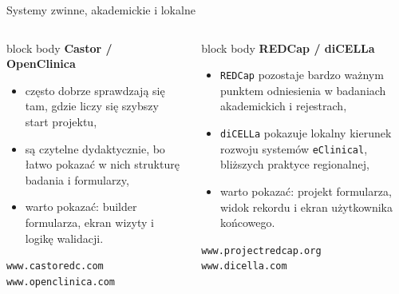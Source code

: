 \begin{frame}{Systemy zwinne, akademickie i lokalne}
  \footnotesize
  \begin{columns}[T,onlytextwidth]
    \begin{beamercolorbox}[wd=\linewidth,sep=0.8em,rounded=true]{block body}
      \textbf{\textcolor{UAFMTeal}{Castor / OpenClinica}}\par\medskip
      \begin{itemize}
        \item często dobrze sprawdzają się tam, gdzie liczy się szybszy start projektu,
        \item są czytelne dydaktycznie, bo łatwo pokazać w nich strukturę badania i formularzy,
        \item warto pokazać: builder formularza, ekran wizyty i logikę walidacji.
      \end{itemize}
      \texttt{www.castoredc.com}\\
      \texttt{www.openclinica.com}
    \end{beamercolorbox}

    \begin{beamercolorbox}[wd=\linewidth,sep=0.8em,rounded=true]{block body}
      \textbf{\textcolor{UAFMOrange}{REDCap / diCELLa}}\par\medskip
      \begin{itemize}
        \item \texttt{REDCap} pozostaje bardzo ważnym punktem odniesienia w badaniach akademickich i rejestrach,
        \item \texttt{diCELLa} pokazuje lokalny kierunek rozwoju systemów \texttt{eClinical}, bliższych praktyce regionalnej,
        \item warto pokazać: projekt formularza, widok rekordu i ekran użytkownika końcowego.
      \end{itemize}
      \texttt{www.projectredcap.org}\\
      \texttt{www.dicella.com}
    \end{beamercolorbox}
  \end{columns}
\end{frame}

